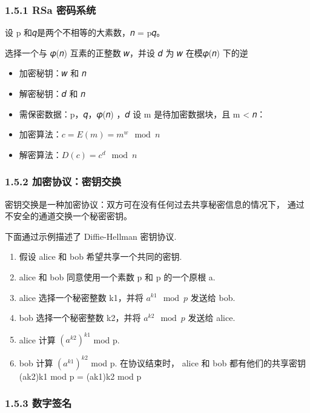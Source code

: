 \subsubsection{1.5.1 RSa 密码系统}\label{rsa-ux5bc6ux7801ux7cfbux7edf}

设 p 和𝑞是两个不相等的大素数，𝑛 = p𝑞。

选择一个与 𝜑(𝑛) 互素的正整数 𝑤，并设 𝑑 为 𝑤 在模𝜑(𝑛) 下的逆

\begin{itemize}
\tightlist
\item
  加密秘钥：𝑤 和 𝑛
\item
  解密秘钥：𝑑 和 𝑛
\item
  需保密数据：p，𝑞，𝜑(𝑛) ，𝑑 设 m 是待加密数据块，且 m \textless{} 𝑛：
\item
  加密算法：\(𝑐 = 𝐸 (m) = m^w\mod 𝑛\)
\item
  解密算法：\(𝐷 (𝑐) = 𝑐^d\mod 𝑛\)
\end{itemize}

\subsubsection{1.5.2
加密协议：密钥交换}\label{ux52a0ux5bc6ux534fux8baeux5bc6ux94a5ux4ea4ux6362}

密钥交换是一种加密协议：双方可在没有任何过去共享秘密信息的情况下，
通过不安全的通道交换一个秘密密钥。

下面通过示例描述了 Diffie-Hellman 密钥协议.

\begin{enumerate}
\def\labelenumi{\arabic{enumi}.}
\tightlist
\item
  假设 alice 和 bob 希望共享一个共同的密钥.
\item
  alice 和 bob 同意使用一个素数 p 和 p 的一个原根 a.
\item
  alice 选择一个秘密整数 k1，并将 \(a^{k1}\mod p\) 发送给 bob.
\item
  bob 选择一个秘密整数 k2，并将 \(a^{k2}\mod p\) 发送给 alice.
\item
  alice 计算 \((a^{k2} )^{k1}\) mod p.
\item
  bob 计算 \((a^{k1})^{k2}\) mod p. 在协议结束时， alice 和 bob
  都有他们的共享密钥 (ak2)k1 mod p = (ak1)k2 mod p
\end{enumerate}

\subsubsection{1.5.3 数字签名}\label{ux6570ux5b57ux7b7eux540d}

